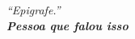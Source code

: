 




\pretextualchapter{}

\vspace{17.5cm}
\begin{flushright}

\textit{``Epigrafe.'' \\ 
	\bfseries Pessoa que falou isso}%

\end{flushright}


